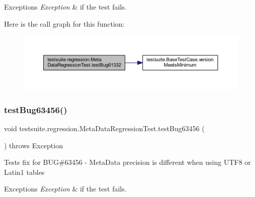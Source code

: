 \begin{DoxyExceptions}{Exceptions}
{\em Exception} & if the test fails. \\
\hline
\end{DoxyExceptions}
Here is the call graph for this function\+:
\nopagebreak
\begin{figure}[H]
\begin{center}
\leavevmode
\includegraphics[width=350pt]{classtestsuite_1_1regression_1_1_meta_data_regression_test_aaf434af6a2a4b3cc948e8973837c8cca_cgraph}
\end{center}
\end{figure}
\mbox{\label{classtestsuite_1_1regression_1_1_meta_data_regression_test_a8d8e4af7ca8136d86aa2ea60237ceb89}} 
\subsubsection{\texorpdfstring{test\+Bug63456()}{testBug63456()}}
{\footnotesize\ttfamily void testsuite.\+regression.\+Meta\+Data\+Regression\+Test.\+test\+Bug63456 (\begin{DoxyParamCaption}{ }\end{DoxyParamCaption}) throws Exception}

Tests fix for B\+UG\#63456 -\/ Meta\+Data precision is different when using U\+T\+F8 or Latin1 tables


\begin{DoxyExceptions}{Exceptions}
{\em Exception} & if the test fails. \\
\hline
\end{DoxyExceptions}
\mbox{\label{classtestsuite_1_1regression_1_1_meta_data_regression_test_af38b67a5bf6e3396cd891b3f8b4d2c8f}} 
